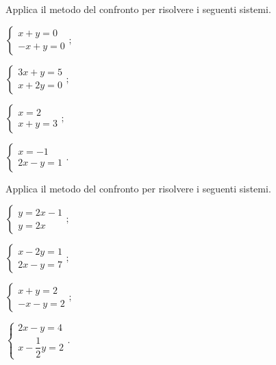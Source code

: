 \begin{esercizio}[\Ast]
 \label{ese:19.16}
Applica il metodo del confronto per risolvere i seguenti sistemi.
 \begin{multicols}{2}
 \begin{enumeratea}
 \item $\left\{\begin{array}{l}x+y=0\\-x+y=0\end{array}\right.;$
\item $\left\{\begin{array}{l}3x+y=5\\x+2y=0\end{array}\right.;$
\item $\left\{\begin{array}{l}x=2\\x+y=3\end{array}\right.;$
\item $\left\{\begin{array}{l}x=-1\\2x-y=1\end{array}\right..$
 \end{enumeratea}
 \end{multicols}
\end{esercizio}

\begin{esercizio}[\Ast]
 \label{ese:19.17}
Applica il metodo del confronto per risolvere i seguenti sistemi.
 \begin{multicols}{2}
 \begin{enumeratea}
 \item $\left\{\begin{array}{l}y=2x-1\\y=2x\end{array}\right.;$
\item $\left\{\begin{array}{l}x-2y=1\\2x-y=7\end{array}\right.;$
\item $\left\{\begin{array}{l}x+y=2\\-x-y=2\end{array}\right.;$
\item $\left\{\begin{array}{l}2x-y=4\\x-\dfrac{1}{2}y=2\end{array}\right..$
 \end{enumeratea}
 \end{multicols}
\end{esercizio}

